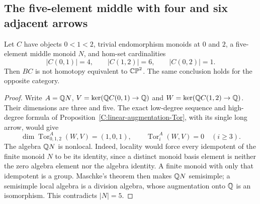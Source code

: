 \subsection{The five-element middle with four and six adjacent arrows}

\begin{proposition}\label{C:middle-five-four-six}
Let $C$ have objects $0<1<2$, trivial endomorphism monoids at $0$ and
$2$, a five-element middle monoid $N$, and hom-set cardinalities
\[
 |C(0,1)|=4,\qquad |C(1,2)|=6,\qquad |C(0,2)|=1.
\]
Then $BC$ is not homotopy equivalent to $\mathbb {CP}^2$.
The same conclusion holds for the opposite category.
\end{proposition}

\begin{proof}
Write $A=\mathbb Q N$, $V=\ker(\mathbb Q C(0,1)\to\mathbb Q)$ and
$W=\ker(\mathbb Q C(1,2)\to\mathbb Q)$.  Their dimensions are three and five.
The exact low-degree sequence and high-degree formula of
Proposition~\ref{C:linear-augmentation-Tor}, with its single long arrow,
would give
\[
 \dim\operatorname{Tor}_{0,1,2}^{A}(W,V)=(1,0,1),
 \qquad \operatorname{Tor}_i^A(W,V)=0\quad(i\geq3).
\]
The algebra $\mathbb Q N$ is nonlocal.  Indeed, locality would force every
idempotent of the finite monoid $N$ to be its identity, since a distinct
monoid basis element is neither the zero algebra element nor the algebra
identity.  A finite monoid with only that idempotent is a group.
Maschke's theorem then makes $\mathbb Q N$ semisimple; a semisimple local algebra
is a division algebra, whose augmentation onto $\mathbb Q$ is an isomorphism.
This contradicts $|N|=5$.


\end{proof}
